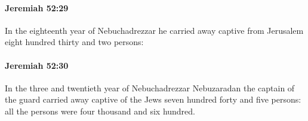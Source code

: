 		\paragraph{Jeremiah 52:29} %
			\label{JEREMIAH-52-29}

			In the eighteenth year of Nebuchadrezzar he carried away captive from Jerusalem eight hundred thirty and two persons:


		\paragraph{Jeremiah 52:30} %
			\label{JEREMIAH-52-30}

			In the three and twentieth year of Nebuchadrezzar Nebuzaradan the captain of the guard carried away captive of the Jews seven hundred forty and five persons: all the persons were four thousand and six hundred.


